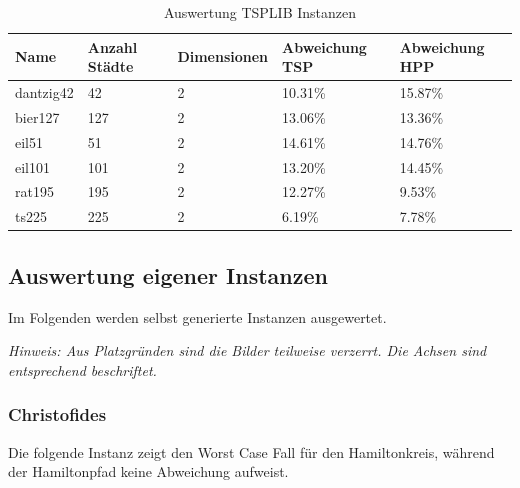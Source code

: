 \documentclass[11pt,a4paper]{article}
\begin{document}
    \begin{table}[H]
                \centering
                \begin{tabular}{| p{2.0cm} | p{2.0cm} | p{2.5cm} | p{2.5cm} | p{2.5cm} |}
                    \hline
                    \small{\textbf{Name}} &
                    \small{\textbf{Anzahl Städte}}  & 
                    \small{\textbf{Dimensionen}} & 
                    \small{\textbf{Abweichung TSP}} & 
                    \small{\textbf{Abweichung HPP}} \\ \hline

                    dantzig42   & 42    & 2     & 10.31\%   & 15.87\%   \\ \hline
                    bier127     & 127   & 2     & 13.06\%   & 13.36\%   \\ \hline
                    eil51       & 51    & 2     & 14.61\%   & 14.76\%   \\ \hline
                    eil101      & 101   & 2     & 13.20\%   & 14.45\%   \\ \hline
                    rat195      & 195   & 2     & 12.27\%   & 9.53\%    \\ \hline
                    ts225       & 225   & 2     &  6.19\%   & 7.78\%    \\ \hline
               \end{tabular}
                \caption{Auswertung TSPLIB Instanzen}
                \label{tab:instanzen_tsplib}
        \end{table}

\subsection{Auswertung eigener Instanzen}
Im Folgenden werden selbst generierte Instanzen ausgewertet. 

\begin{flushleft}
\emph{Hinweis: Aus Platzgründen sind die Bilder teilweise verzerrt. Die Achsen sind entsprechend beschriftet.}
\end{flushleft}

\subsubsection{Christofides}
Die folgende Instanz zeigt den Worst Case Fall für den Hamiltonkreis, während der Hamiltonpfad keine Abweichung aufweist.
\end{document}
